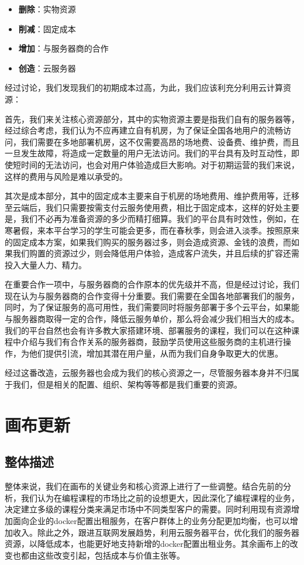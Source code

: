 \documentclass[a4paper]{ctexart}
\begin{document}
\begin{itemize}
  \item \textbf{删除}：实物资源
  \item \textbf{削减}：固定成本
  \item \textbf{增加}：与服务器商的合作
  \item \textbf{创造}：云服务器
\end{itemize}

经过讨论，我们发现我们的初期成本过高，为此，我们应该利充分利用云计算资源：

首先，我们来关注核心资源部分，其中的实物资源主要是指我们自有的服务器等，经过综合考虑，我们认为不应再建立自有机房，为了保证全国各地用户的流畅访问，我们需要在多地部署机房，这不仅需要高昂的场地费、设备费、维护费，而且一旦发生故障，将造成一定数量的用户无法访问。我们的平台具有及时互动性，即使短时间的无法访问，也会对用户体验造成巨大影响。对于初期运营的我们来说，这样的费用与风险是难以承受的。

其次是成本部分，其中的固定成本主要来自于机房的场地费用、维护费用等，迁移至云端后，我们只需要按需支付云服务使用费，相比于固定成本，这样的好处主要是，我们不必再为准备资源的多少而精打细算。我们的平台具有时效性，例如，在寒暑假，来本平台学习的学生可能会更多，而在春秋季，则会进入淡季。按照原来的固定成本方案，如果我们购买的服务器过多，则会造成资源、金钱的浪费，而如果我们购置的资源过少，则会降低用户体验，造成客户流失，并且后续的扩容还需投入大量人力、精力。

在重要合作一项中，与服务器商的合作原本的优先级并不高，但是经过讨论，我们现在认为与服务器商的合作变得十分重要。我们需要在全国各地部署我们的服务，同时，为了保证服务的高可用性，我们需要同时将服务部署于多个云平台，如果能与服务器商取得一定的合作，降低云服务单价，那么将会减少我们相当大的成本。我们的平台自然也会有许多教大家搭建环境、部署服务的课程，我们可以在这种课程中介绍与我们有合作关系的服务器商，鼓励学员使用这些服务商的主机进行操作，为他们提供引流，增加其潜在用户量，从而为我们自身争取更大的优惠。

经过这番改造，云服务器也会成为我们的核心资源之一，尽管服务器本身并不归属于我们，但是相关的配置、组织、架构等等都是我们重要的资源。

\section{画布更新}

\subsection{整体描述}
整体来说，我们在画布的关键业务和核心资源上进行了一些调整。结合先前的分析，我们认为在编程课程的市场比之前的设想更大，因此深化了编程课程的业务，决定建立多级的课程分类来满足市场中不同类型客户的需要。同时利用现有资源增加面向企业的docker配置出租服务，在客户群体上的业务分配更加均衡，也可以增加收入。除此之外，跟进互联网发展趋势，利用云服务器平台，优化我们的服务器资源，以降低成本，也能更好地支持新增的docker配置出租业务。其余画布上的改变也都由这些改变引起，包括成本与价值主张等。
\end{document}

